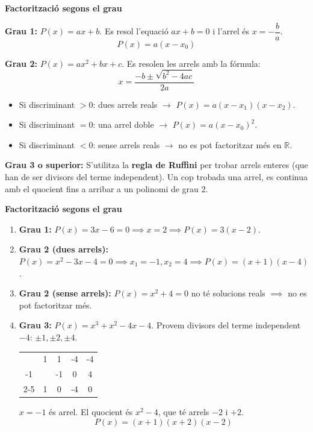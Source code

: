 \documentclass[12pt]{article}
\begin{document}
\begin{concept}
\textbf{Factorització segons el grau}

\textbf{Grau 1:} $P(x) = ax+b$. Es resol l'equació $ax+b=0$ i l'arrel és $x = -\dfrac{b}{a}$.
\[
P(x) = a(x - x_0)
\]

\textbf{Grau 2:} $P(x) = ax^2+bx+c$. Es resolen les arrels amb la fórmula:
\[
x = \dfrac{-b \pm \sqrt{b^2-4ac}}{2a}
\]
\begin{itemize}
    \item Si discriminant $> 0$: dues arrels reals $\to$ $P(x) = a(x-x_1)(x-x_2)$.
    \item Si discriminant $= 0$: una arrel doble $\to$ $P(x) = a(x-x_0)^2$.
    \item Si discriminant $< 0$: sense arrels reals $\to$ no es pot factoritzar més en $\mathbb{R}$.
\end{itemize}

\textbf{Grau 3 o superior:} S'utilitza la \textbf{regla de Ruffini} per trobar arrels enteres (que han de ser divisors del terme independent). Un cop trobada una arrel, es continua amb el quocient fins a arribar a un polinomi de grau 2.
\end{concept}

\begin{exemple}
\textbf{Factorització segons el grau}
\begin{enumerate}[label=\alph*)]
    \item \textbf{Grau 1:} $P(x) = 3x-6 = 0 \implies x = 2 \implies P(x) = 3(x-2)$.
    \item \textbf{Grau 2 (dues arrels):} $P(x) = x^2-3x-4 = 0 \implies x_1=-1, x_2=4 \implies P(x) = (x+1)(x-4)$.
    \item \textbf{Grau 2 (sense arrels):} $P(x) = x^2+4 = 0$ no té solucions reals $\implies$ no es pot factoritzar més.
    \item \textbf{Grau 3:} $P(x) = x^3+x^2-4x-4$.
    Provem divisors del terme independent $-4$: $\pm 1, \pm 2, \pm 4$.
    \begin{center}
    \begin{tabular}{c|cccc}
        & 1 & 1 & -4 & -4 \\
    -1  &   & -1 & 0 & 4 \\
    \cline{2-5}
        & 1 & 0 & -4 & 0 \\
    \end{tabular}
    \end{center}
    $x=-1$ és arrel. El quocient és $x^2-4$, que té arrels $-2$ i $+2$.
    \[
    P(x) = (x+1)(x+2)(x-2)
    \]
\end{enumerate}
\end{exemple}
\end{document}
